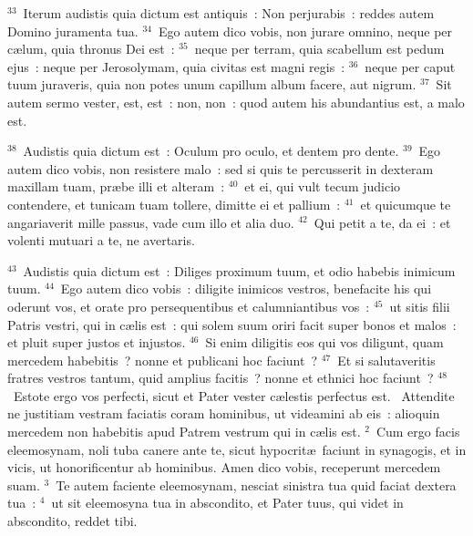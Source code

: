 ${}^{33}$~Iterum audistis quia dictum est antiquis~: Non perjurabis~: reddes autem Domino juramenta tua.
${}^{34}$~Ego autem dico vobis, non jurare omnino, neque per c\ae lum, quia thronus Dei est~:
${}^{35}$~neque per terram, quia scabellum est pedum ejus~: neque per Jerosolymam, quia civitas est magni regis~:
${}^{36}$~neque per caput tuum juraveris, quia non potes unum capillum album facere, aut nigrum.
${}^{37}$~Sit autem sermo vester, est, est~: non, non~: quod autem his abundantius est, a malo est.


${}^{38}$~Audistis quia dictum est~: Oculum pro oculo, et dentem pro dente.
${}^{39}$~Ego autem dico vobis, non resistere malo~: sed si quis te percusserit in dexteram maxillam tuam, pr\ae be illi et alteram~:
${}^{40}$~et ei, qui vult tecum judicio contendere, et tunicam tuam tollere, dimitte ei et pallium~:
${}^{41}$~et quicumque te angariaverit mille passus, vade cum illo et alia duo.
${}^{42}$~Qui petit a te, da ei~: et volenti mutuari a te, ne avertaris.


${}^{43}$~Audistis quia dictum est~: Diliges proximum tuum, et odio habebis inimicum tuum.
${}^{44}$~Ego autem dico vobis~: diligite inimicos vestros, benefacite his qui oderunt vos, et orate pro persequentibus et calumniantibus vos~:
${}^{45}$~ut sitis filii Patris vestri, qui in c\ae lis est~: qui solem suum oriri facit super bonos et malos~: et pluit super justos et injustos.
${}^{46}$~Si enim diligitis eos qui vos diligunt, quam mercedem habebitis~? nonne et publicani hoc faciunt~?
${}^{47}$~Et si salutaveritis fratres vestros tantum, quid amplius facitis~? nonne et ethnici hoc faciunt~?
${}^{48}$~Estote ergo vos perfecti, sicut et Pater vester c\ae lestis perfectus est.
~Attendite ne justitiam vestram faciatis coram hominibus, ut videamini ab eis~: alioquin mercedem non habebitis apud Patrem vestrum qui in c\ae lis est.
${}^{2}$~Cum ergo facis eleemosynam, noli tuba canere ante te, sicut hypocrit\ae\ faciunt in synagogis, et in vicis, ut honorificentur ab hominibus. Amen dico vobis, receperunt mercedem suam.
${}^{3}$~Te autem faciente eleemosynam, nesciat sinistra tua quid faciat dextera tua~:
${}^{4}$~ut sit eleemosyna tua in abscondito, et Pater tuus, qui videt in abscondito, reddet tibi.


